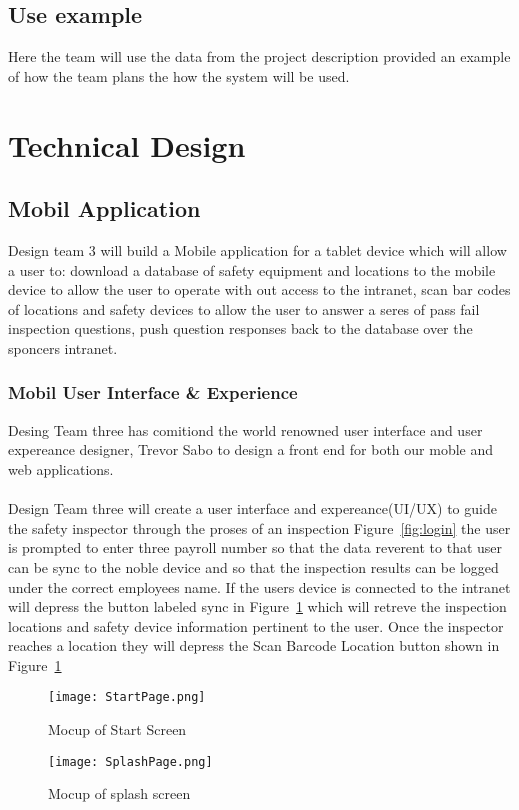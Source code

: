 \documentclass[Letter,11pt]{article}
\begin{document}
	\subsection{Use example}
		Here the team will use the data from the project description provided an example of how the team plans the how the system will be used.
		  
		
\section{Technical Design}
	
	\subsection{Mobil Application}
	Design team 3 will build a Mobile application for a tablet device which will allow a user to: download a database of safety equipment and locations to the mobile device to allow the user to operate with out access to the intranet, scan bar codes of locations and safety devices to allow the user to answer a seres of pass fail inspection questions, push question responses back to the database over the sponcers intranet.
	\subsubsection{Mobil User Interface \& Experience}
	Desing Team three has comitiond the world renowned user interface and user expereance designer, Trevor Sabo to design a front end for both our moble and web applications.\\
	\\
	Design Team three will create a user interface and expereance(UI/UX) to guide the safety inspector through the proses of an inspection Figure~\ref{fig:login} the user is prompted to enter three payroll number so that the data reverent to that user can be sync to the noble device and so that the inspection results can be logged under the correct employees name.
	If the users device is connected to the intranet will depress the button labeled sync in Figure~\ref{fig:splash} which will retreve the inspection locations and safety device information pertinent to the user.
	Once the inspector reaches a location they will depress the Scan Barcode Location button shown in Figure~\ref{fig:splash}
	\begin{figure}[h]
		
		\begin{minipage}{0.5\textwidth}
			\centering
			\texttt{[image: StartPage.png]}
			\caption{\label{fig:login}Mocup of Start Screen}
		\end{minipage}%
		\begin{minipage}{0.5\textwidth}
			\centering
			\texttt{[image: SplashPage.png]}
			\caption{\label{fig:splash}Mocup of splash screen}
		\end{minipage}
	\end{figure}
	
\end{document}
